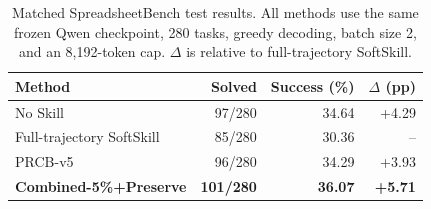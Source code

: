 \begin{table}[t]
\caption{Matched SpreadsheetBench test results.  All methods use the same frozen Qwen checkpoint, 280 tasks, greedy decoding, batch size 2, and an 8,192-token cap.  $\Delta$ is relative to full-trajectory SoftSkill.}
\label{tab:test-main}
\centering
\small
\begin{tabular}{lrrr}
\toprule
Method & Solved & Success (\%) & $\Delta$ (pp) \\
\midrule
No Skill & 97/280 & 34.64 & +4.29 \\
Full-trajectory SoftSkill & 85/280 & 30.36 & -- \\
PRCB-v5 & 96/280 & 34.29 & +3.93 \\
\textbf{Combined-5\%+Preserve} & \textbf{101/280} & \textbf{36.07} & \textbf{+5.71} \\
\bottomrule
\end{tabular}
\end{table}

